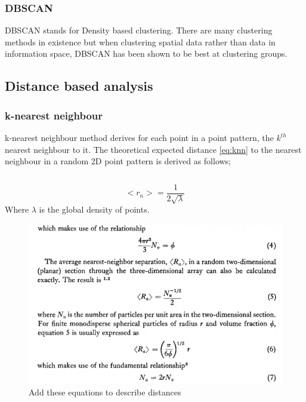 \subsubsection{DBSCAN}
DBSCAN stands for Density based clustering. There are many clustering methods in existence but when clustering spatial data rather than data in information space, DBSCAN has been shown to be best at clustering groups\cite{}.

\subsection{Distance based analysis}

\subsubsection{k-nearest neighbour}
k-nearest neighbour method derives for each point in a point pattern, the $k^{th}$ nearest neighbour to it.
The theoretical expected distance \ref{eq:knn} to the nearest neighbour in a random 2D point pattern is derived as follows;

\begin{equation}
    
\end{equation}

\begin{equation}
\label{eq:knn}
    <r_n> = \frac{1}{2\sqrt{\lambda}}
\end{equation}
Where $\lambda$ is the global density of points.


\begin{figure}
    \centering
    \includegraphics{Chapter3/Figs/knn.PNG}
    \caption{Add these equations to describe distances}
    \label{fig:knnequations}
\end{figure}

